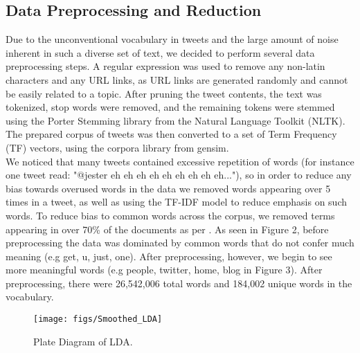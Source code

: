 \documentclass{acm_proc_article-sp}
\begin{document}
\subsection{Data Preprocessing and Reduction}
\hspace*{5mm}Due to the unconventional vocabulary in tweets and the large amount of noise inherent in such a diverse set of text, we decided to perform several data preprocessing steps. A regular expression was used to remove any non-latin characters and any URL links, as URL links are generated randomly and cannot be easily related to a topic. After pruning the tweet contents, the text was tokenized, stop words were removed, and the remaining tokens were stemmed using the Porter Stemming library from the Natural Language Toolkit (NLTK). The prepared corpus of tweets was then converted to a set of Term Frequency (TF) vectors, using the corpora library from gensim. \\
We noticed that many tweets contained excessive repetition of words (for instance one tweet read: "@jester eh eh eh eh eh eh eh eh eh..."), so in order to reduce any bias towards overused words in the data we removed words appearing over 5 times in a tweet, as well as using the TF-IDF model to reduce emphasis on such words. To reduce bias to common words across the corpus, we removed terms appearing in over 70\% of the documents as per \cite{zhao2011comparing}. As seen in Figure 2, before preprocessing the data was dominated by common words that do not confer much meaning (e.g get, u, just, one). After preprocessing, however, we begin to see more meaningful words (e.g people, twitter, home, blog in Figure 3). After preprocessing, there were 26,542,006 total words and 184,002 unique words in the vocabulary.\\


\begin{figure}[ht]
\texttt{[image: figs/Smoothed\_LDA]}
\caption{Plate Diagram of LDA.}
\end{figure}
\end{document}
